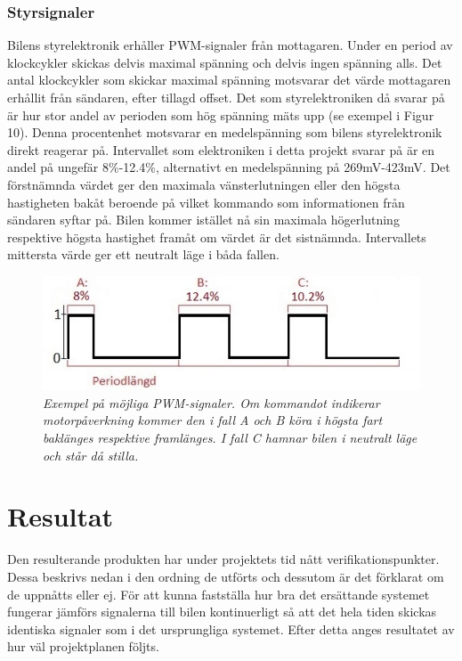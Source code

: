 \documentclass[a4paper]{article}
\begin{document}
\subsubsection{Styrsignaler}
Bilens styrelektronik erhåller PWM-signaler från mottagaren. Under en period av klockcykler skickas delvis maximal spänning och delvis ingen spänning alls. Det antal klockcykler som skickar maximal spänning motsvarar det värde mottagaren erhållit från sändaren, efter tillagd offset. Det som styrelektroniken då svarar på är hur stor andel av perioden som hög spänning mäts upp (se exempel i Figur 10). Denna procentenhet motsvarar en medelspänning som bilens styrelektronik direkt reagerar på. Intervallet som elektroniken i detta projekt svarar på är en andel på ungefär 8\%-12.4\%, alternativt en medelspänning på 269mV-423mV. Det förstnämnda värdet ger den maximala vänsterlutningen eller den högsta hastigheten bakåt beroende på vilket kommando som informationen från sändaren syftar på. Bilen kommer istället nå sin maximala högerlutning respektive högsta hastighet framåt om värdet är det sistnämnda. Intervallets mittersta värde ger ett neutralt läge i båda fallen.


\begin{figure}[H]
\includegraphics[scale=1]{PWMsignals.jpg}
\centering
\caption{\it Exempel på möjliga PWM-signaler. Om kommandot indikerar motorpåverkning kommer den i fall A och B köra i högsta fart baklänges respektive framlänges. I fall C hamnar bilen i neutralt läge och står då stilla.}
\end{figure}




\newpage
\section{Resultat}
Den resulterande produkten har under projektets tid nått verifikationspunkter. Dessa beskrivs nedan i den ordning de utförts och dessutom är det förklarat om de uppnåtts eller ej. För att kunna fastställa hur bra det ersättande systemet fungerar jämförs signalerna till bilen kontinuerligt så att det hela tiden skickas identiska signaler som i det ursprungliga systemet. Efter detta anges resultatet av hur väl projektplanen följts.
\end{document}
